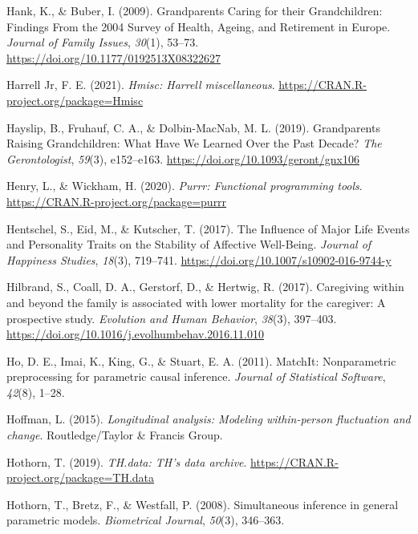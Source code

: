 \documentclass[
  english,
  man,floatsintext]{apa7}
\begin{document}
\leavevmode\hypertarget{ref-hankGrandparentsCaringTheir2009}{}%
Hank, K., \& Buber, I. (2009). Grandparents Caring for their Grandchildren: Findings From the 2004 Survey of Health, Ageing, and Retirement in Europe. \emph{Journal of Family Issues}, \emph{30}(1), 53--73. \url{https://doi.org/10.1177/0192513X08322627}

\leavevmode\hypertarget{ref-R-Hmisc}{}%
Harrell Jr, F. E. (2021). \emph{Hmisc: Harrell miscellaneous}. \url{https://CRAN.R-project.org/package=Hmisc}

\leavevmode\hypertarget{ref-hayslipGrandparentsRaisingGrandchildren2019}{}%
Hayslip, B., Fruhauf, C. A., \& Dolbin-MacNab, M. L. (2019). Grandparents Raising Grandchildren: What Have We Learned Over the Past Decade? \emph{The Gerontologist}, \emph{59}(3), e152--e163. \url{https://doi.org/10.1093/geront/gnx106}

\leavevmode\hypertarget{ref-R-purrr}{}%
Henry, L., \& Wickham, H. (2020). \emph{Purrr: Functional programming tools}. \url{https://CRAN.R-project.org/package=purrr}

\leavevmode\hypertarget{ref-hentschelInfluenceMajorLife2017}{}%
Hentschel, S., Eid, M., \& Kutscher, T. (2017). The Influence of Major Life Events and Personality Traits on the Stability of Affective Well-Being. \emph{Journal of Happiness Studies}, \emph{18}(3), 719--741. \url{https://doi.org/10.1007/s10902-016-9744-y}

\leavevmode\hypertarget{ref-hilbrandCaregivingFamilyAssociated2017}{}%
Hilbrand, S., Coall, D. A., Gerstorf, D., \& Hertwig, R. (2017). Caregiving within and beyond the family is associated with lower mortality for the caregiver: A prospective study. \emph{Evolution and Human Behavior}, \emph{38}(3), 397--403. \url{https://doi.org/10.1016/j.evolhumbehav.2016.11.010}

\leavevmode\hypertarget{ref-MatchIt2011}{}%
Ho, D. E., Imai, K., King, G., \& Stuart, E. A. (2011). MatchIt: Nonparametric preprocessing for parametric causal inference. \emph{Journal of Statistical Software}, \emph{42}(8), 1--28.

\leavevmode\hypertarget{ref-hoffmanLongitudinalAnalysisModeling2015}{}%
Hoffman, L. (2015). \emph{Longitudinal analysis: Modeling within-person fluctuation and change}. Routledge/Taylor \& Francis Group.

\leavevmode\hypertarget{ref-R-TH.data}{}%
Hothorn, T. (2019). \emph{TH.data: TH's data archive}. \url{https://CRAN.R-project.org/package=TH.data}

\leavevmode\hypertarget{ref-R-multcomp}{}%
Hothorn, T., Bretz, F., \& Westfall, P. (2008). Simultaneous inference in general parametric models. \emph{Biometrical Journal}, \emph{50}(3), 346--363.
\end{document}
